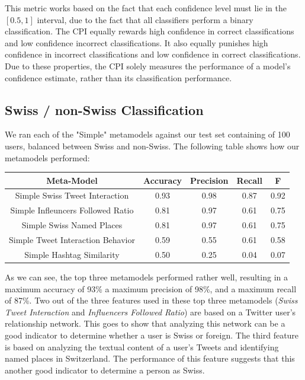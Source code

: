 \documentclass[10pt,a4paper]{article}
\begin{document}
This metric works based on the fact that each confidence level must lie in the $[0.5, 1]$ interval, due to the fact that all classifiers perform a binary classification. The CPI equally rewards high confidence in correct classifications and low confidence incorrect classifications. It also equally punishes high confidence in incorrect classifications and low confidence in correct classifications. Due to these properties, the CPI solely measures the performance of a model's confidence estimate, rather than its classification performance.

\subsection{Swiss / non-Swiss Classification}
We ran each of the "Simple" metamodels against our test set containing of 100 users, balanced between Swiss and non-Swiss. The following table shows how our metamodels performed:

\begin{center}
\begin{tabular}{ |c|c|c|c|c| }
\hline
\textbf{Meta-Model} & \textbf{Accuracy} & \textbf{Precision} & \textbf{Recall} & \textbf{F} \\
\hline
Simple Swiss Tweet Interaction & 0.93 & 0.98 & 0.87 & 0.92 \\
\hline
Simple Infleuncers Followed Ratio & 0.81 & 0.97 & 0.61 & 0.75 \\
\hline
Simple Swiss Named Places & 0.81 & 0.97 & 0.61 & 0.75 \\
\hline
\hline
Simple Tweet Interaction Behavior & 0.59 & 0.55 & 0.61 & 0.58 \\
\hline
Simple Hashtag Similarity & 0.50 & 0.25 & 0.04 & 0.07 \\
\hline
\end{tabular}
\end{center}

As we can see, the top three metamodels performed rather well, resulting in a maximum accuracy of 93\% a maximum precision of 98\%, and a maximum recall of 87\%. Two out of the three features used in these top three metamodels (\textit{Swiss Tweet Interaction} and \textit{Influencers Followed Ratio}) are based on a Twitter user's relationship network. This goes to show that analyzing this network can be a good indicator to determine whether a user is Swiss or foreign. The third feature is based on analyzing the textual content of a user's Tweets and identifying named places in Switzerland. The performance of this feature suggests that this another good indicator to determine a person as Swiss.
\end{document}
